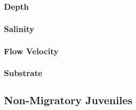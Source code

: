 \documentclass[
]{book}
\begin{document}
\hypertarget{depth-9}{%
\subsubsection{Depth}\label{depth-9}}

\hypertarget{salinity-9}{%
\subsubsection{Salinity}\label{salinity-9}}

\hypertarget{flow-velocity-9}{%
\subsubsection{Flow Velocity}\label{flow-velocity-9}}

\hypertarget{substrate-9}{%
\subsubsection{Substrate}\label{substrate-9}}

\hypertarget{non-migratory-juveniles-3}{%
\subsection{Non-Migratory Juveniles}\label{non-migratory-juveniles-3}}
\end{document}
